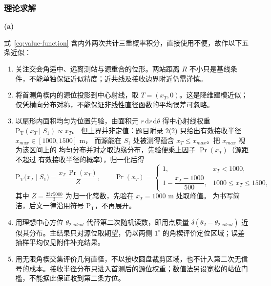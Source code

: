 \subsubsection{理论求解}
\noindent\textbf{(a)}\hspace{0.2em}{\heiti 理论推导}\songti

式~\eqref{eq:value-function} 含内外两次共计三重概率积分，直接使用不便，故作以下五条近似：

\begin{enumerate}
    \item 关注交会角适中、远离测站与源重合的位形。两站距离 $R$ 不小只是基线条件，不能单独保证近似精度；近共线及接收边界附近仍需谨慎。
    \item 将首测角楔内的源位投影到中心射线，取 $T=(x_T,0)$。这是降维建模近似；仅凭横向分布对称，不能保证非线性直径函数的平均误差可忽略。
    \item 以扇形内面积均匀为位置先验，由面积元 $r\,\mathrm dr\,\mathrm d\theta$ 得中心射线权重 $\mathrm{P_T}(x_T\mid S_1)\propto x_T$。
        但上界并非定值：题目附录 2(2) 只给出有效接收半径 $x_{max}\in[1000,1500]$ m，
        而源能在 $S_1$ 处被测得蕴含 $x_T\le x_{max}$。把 $x_{max}$ 视为该区间上的
        均匀分布并对之取边缘分布，先验便乘上因子 $\Pr(x_T)$（源距不超过
        有效接收半径的概率），归一化后得
          \begin{equation}
              \mathrm{P_T}\bigl(x_T\mid S_1\bigr)=\frac{x_T\,\Pr(x_T)}{Z},
              \qquad
              \Pr(x_T)=
              \begin{cases}
                  1, & x_T<1000,\\[2pt]
                  1-\dfrac{x_T-1000}{500}, & 1000\le x_T\le1500,
              \end{cases}
              \label{eq:pt-x}
          \end{equation}
          其中 $Z=\frac{2375000}{3}$ 为归一化常数，先验在 $x_T=1000$ m 处取峰值。
          为书写简洁，后文一律沿用符号 $\mathrm{P_T}$，不再展开。
    \item 用理想中心方位 $\theta_{2,ideal}$ 代替第二次随机读数，即用点质量 $\delta(\theta_2-\theta_{2,ideal})$ 近似其分布。主结果只对源位取期望，仍以两侧 $1^\circ$ 的角楔评价定位区域；误差抽样平均仅见附件补充结果。
    \item 用无限角楔交集评价几何直径，不以接收圆盘裁剪区域，也不计入第二次无信号的成本。接收半径分布只进入首测后的源位权重；数值法另设宽松的站位门槛，不能据此保证收到第二条方位。
\end{enumerate}

